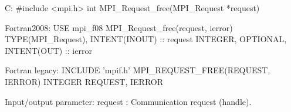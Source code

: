 C:
#include <mpi.h>
int MPI_Request_free(MPI_Request *request)

Fortran2008:
USE mpi_f08
MPI_Request_free(request, ierror)
TYPE(MPI_Request), INTENT(INOUT) :: request
INTEGER, OPTIONAL, INTENT(OUT) :: ierror

Fortran legacy:
INCLUDE ’mpif.h’
MPI_REQUEST_FREE(REQUEST, IERROR)
INTEGER    REQUEST, IERROR

Input/output parameter:
request : Communication request (handle).
